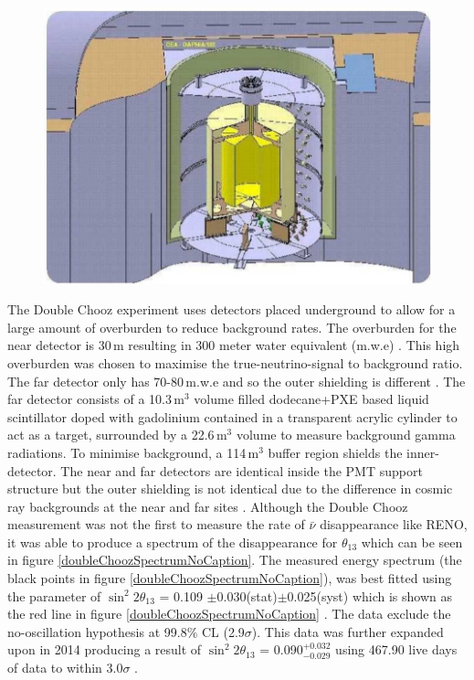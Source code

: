 \begin{figure}[!h]
 \centering
 \includegraphics[width=0.5\linewidth]{Chapter1/Figs/doublChoozDetectorDiagram.jpg} %
 \label{fig:DoubleChoozFarDetector}
\end{figure}
The Double Chooz experiment uses detectors placed underground to allow for a large amount of overburden to reduce background rates. The overburden for the near detector is 30\,m resulting in 300 meter water equivalent (m.w.e) \cite{lasserre2006}. This high overburden was chosen to maximise the true-neutrino-signal to background ratio. The far detector only has 70-80\,m.w.e and so the outer shielding is different \cite{lasserre2006}. The far detector consists of a 10.3\,m$^3$ volume filled dodecane+PXE based liquid scintillator doped with gadolinium contained in a transparent acrylic cylinder to act as a target, surrounded by a 22.6\,m$^3$ volume to measure background gamma radiations. To minimise background, a 114\,m$^3$ buffer region shields the inner-detector. The near and far detectors are identical inside the PMT support structure but the outer shielding is not identical due to the difference in cosmic ray backgrounds at the near and far sites \cite{lasserre2006}. Although the Double Chooz measurement  was not the first to measure the rate of $\bar{\nu}$ disappearance \cite{reno_may_2012} like RENO, it was able to produce a spectrum of the disappearance for $\theta_{13}$ which can be seen in figure \ref{doubleChoozSpectrumNoCaption}. The measured energy spectrum (the black points in figure \ref{doubleChoozSpectrumNoCaption}), was best fitted using the parameter of $\sin^2{2\theta_{13}}$ = 0.109 $\pm$0.030(stat)$\pm$0.025(syst) which is shown as the red line in figure \ref{doubleChoozSpectrumNoCaption} \cite{Abe_2012}. The data exclude the no-oscillation hypothesis at 99.8$\%$ CL (2.9$\sigma$)\cite{Abe_2012}. This data was further expanded upon in 2014 producing a result of $\sin^2{2\theta_{13}}$ = 0.090$^{+0.032}_{-0.029}$ using 467.90 live days of data to within $3.0\sigma$ \cite{abe2014improved}.
